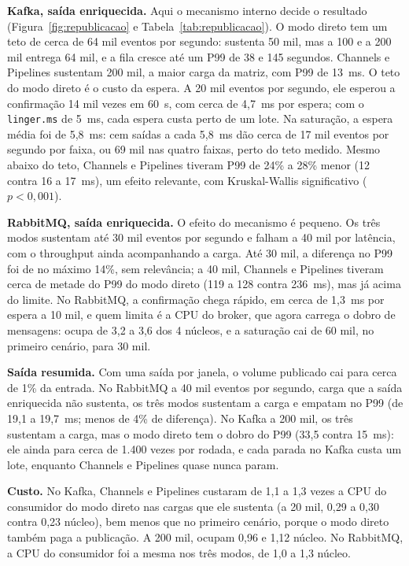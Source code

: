 \documentclass[12pt]{article}
\begin{document}
\textbf{Kafka, saída enriquecida.} Aqui o mecanismo interno decide o resultado
(Figura~\ref{fig:republicacao} e Tabela~\ref{tab:republicacao}). O modo direto tem um
teto de cerca de 64 mil eventos por segundo: sustenta 50 mil, mas a 100 e a 200 mil
entrega 64 mil, e a fila cresce até um P99 de 38 e 145 segundos. Channels e Pipelines
sustentam 200 mil, a maior carga da matriz, com P99 de 13~ms. O teto do modo direto é o
custo da espera. A 20 mil eventos por segundo, ele esperou a confirmação 14 mil vezes
em 60~s, com cerca de 4,7~ms por espera; com o \texttt{linger.ms} de 5~ms, cada espera
custa perto de um lote. Na saturação, a espera média foi de 5,8~ms: cem saídas a cada
5,8~ms dão cerca de 17 mil eventos por segundo por faixa, ou 69 mil nas quatro faixas,
perto do teto medido. Mesmo abaixo do teto, Channels e Pipelines tiveram P99 de 24\% a 28\% menor (12
contra 16 a 17~ms), um efeito relevante, com Kruskal-Wallis significativo
($p < 0{,}001$).

\textbf{RabbitMQ, saída enriquecida.} O efeito do mecanismo é pequeno. Os três modos
sustentam até 30 mil eventos por segundo e falham a 40 mil por latência, com o
throughput ainda acompanhando a carga. Até 30 mil, a diferença no P99 foi de no máximo
14\%, sem relevância; a 40 mil, Channels e Pipelines tiveram cerca de metade do P99 do
modo direto (119 a 128 contra 236~ms), mas já acima do limite. No RabbitMQ, a confirmação
chega rápido, em cerca de 1,3~ms por espera a 10 mil, e quem limita é a CPU do broker,
que agora carrega o dobro de mensagens: ocupa de 3,2 a 3,6 dos 4 núcleos, e a saturação
cai de 60 mil, no primeiro cenário, para 30 mil.

\textbf{Saída resumida.} Com uma saída por janela, o volume publicado cai para cerca de
1\% da entrada. No RabbitMQ a 40 mil eventos por segundo, carga que a saída enriquecida
não sustenta, os três modos sustentam a carga e empatam no P99 (de 19,1 a 19,7~ms; menos
de 4\% de diferença). No Kafka a 200 mil, os três sustentam a carga, mas o modo direto
tem o dobro do P99 (33,5 contra 15~ms): ele ainda para cerca de 1.400 vezes por rodada, e
cada parada no Kafka custa um lote, enquanto Channels e Pipelines quase nunca param.

\textbf{Custo.} No Kafka, Channels e Pipelines custaram de 1,1 a 1,3 vezes a CPU do
consumidor do modo direto nas cargas que ele sustenta (a 20 mil, 0,29 a 0,30 contra 0,23
núcleo), bem menos que no primeiro cenário, porque o modo direto também paga a
publicação. A 200 mil, ocupam 0,96 e 1,12 núcleo. No RabbitMQ, a CPU do consumidor foi a
mesma nos três modos, de 1,0 a 1,3 núcleo.
\end{document}
